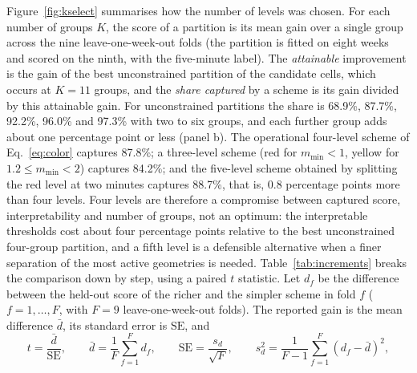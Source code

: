 \documentclass[pdflatex,sn-mathphys-num]{sn-jnl}
\newcommand{\mmin}{m_{\min}}
\begin{document}
Figure~\ref{fig:kselect} summarises how the number of levels was chosen. For each number of groups $K$, the score of a partition is its mean gain over a single group across the nine leave-one-week-out folds (the partition is fitted on eight weeks and scored on the ninth, with the five-minute label). The \emph{attainable} improvement is the gain of the best unconstrained partition of the candidate cells, which occurs at $K=11$ groups, and the \emph{share captured} by a scheme is its gain divided by this attainable gain. For unconstrained partitions the share is 68.9\%, 87.7\%, 92.2\%, 96.0\% and 97.3\% with two to six groups, and each further group adds about one percentage point or less (panel b). The operational four-level scheme of Eq.~\eqref{eq:color} captures 87.8\%; a three-level scheme (red for $\mmin<1$, yellow for $1.2\le\mmin<2$) captures 84.2\%; and the five-level scheme obtained by splitting the red level at two minutes captures 88.7\%, that is, 0.8 percentage points more than four levels. Four levels are therefore a compromise between captured score, interpretability and number of groups, not an optimum: the interpretable thresholds cost about four percentage points relative to the best unconstrained four-group partition, and a fifth level is a defensible alternative when a finer separation of the most active geometries is needed. Table~\ref{tab:increments} breaks the comparison down by step, using a paired $t$ statistic. Let $d_f$ be the difference between the held-out score of the richer and the simpler scheme in fold $f$ ($f=1,\dots,F$, with $F=9$ leave-one-week-out folds). The reported gain is the mean difference $\bar d$, its standard error is $\mathrm{SE}$, and
\begin{equation}\label{eq:tstat}
 t=\frac{\bar d}{\mathrm{SE}},\qquad \bar d=\frac1F\sum_{f=1}^{F}d_f,\qquad \mathrm{SE}=\frac{s_d}{\sqrt F},\qquad s_d^2=\frac1{F-1}\sum_{f=1}^{F}\left(d_f-\bar d\right)^2 ,
\end{equation}
\end{document}
